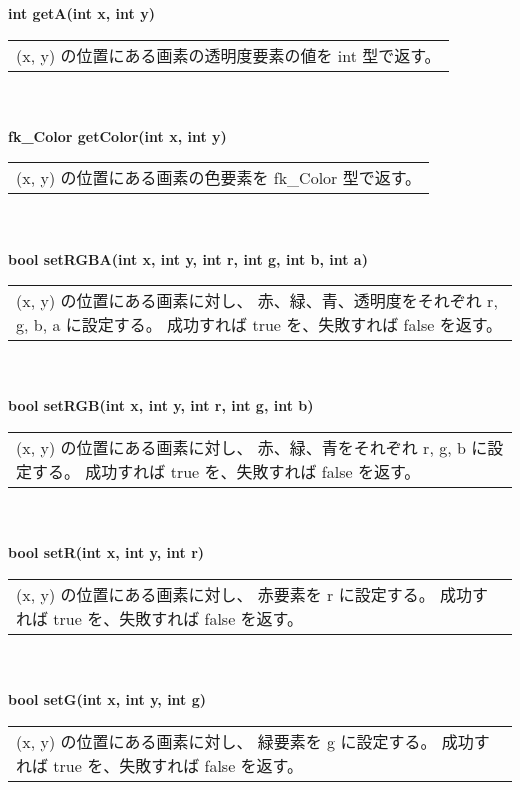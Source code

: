 \begin{tabbing}
\> \textbf{int getA(int x, int y)} \\
	\> \> \begin{tabular}{p{15cm}}
		(x, y) の位置にある画素の透明度要素の値を int 型で返す。
	\end{tabular} \\ \\

\> \textbf{fk\_Color getColor(int x, int y)} \\
	\> \> \begin{tabular}{p{15cm}}
		(x, y) の位置にある画素の色要素を fk\_Color 型で返す。
	\end{tabular} \\ \\

\> \textbf{bool setRGBA(int x, int y, int r, int g, int b, int a)} \\
	\> \> \begin{tabular}{p{15cm}}
		(x, y) の位置にある画素に対し、
		赤、緑、青、透明度をそれぞれ r, g, b, a に設定する。
		成功すれば true を、失敗すれば false を返す。
	\end{tabular} \\ \\

\> \textbf{bool setRGB(int x, int y, int r, int g, int b)} \\
	\> \> \begin{tabular}{p{15cm}}
		(x, y) の位置にある画素に対し、
		赤、緑、青をそれぞれ r, g, b に設定する。
		成功すれば true を、失敗すれば false を返す。
	\end{tabular} \\ \\

\> \textbf{bool setR(int x, int y, int r)} \\
	\> \> \begin{tabular}{p{15cm}}
		(x, y) の位置にある画素に対し、
		赤要素を r に設定する。
		成功すれば true を、失敗すれば false を返す。
	\end{tabular} \\ \\

\> \textbf{bool setG(int x, int y, int g)} \\
	\> \> \begin{tabular}{p{15cm}}
		(x, y) の位置にある画素に対し、
		緑要素を g に設定する。
		成功すれば true を、失敗すれば false を返す。
	\end{tabular} \\ \\


\end{tabbing}
